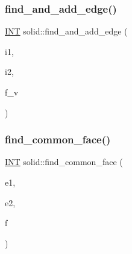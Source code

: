 \mbox{\label{classsolid_a91c02de4312c4942c0f6642154d97047}} 
\subsubsection{\texorpdfstring{find\+\_\+and\+\_\+add\+\_\+edge()}{find\_and\_add\_edge()}}
{\footnotesize\ttfamily \mbox{\hyperlink{galois_8h_a09fddde158a3a20bd2dcadb609de11dc}{I\+NT}} solid\+::find\+\_\+and\+\_\+add\+\_\+edge (\begin{DoxyParamCaption}\item[{\mbox{\hyperlink{galois_8h_a09fddde158a3a20bd2dcadb609de11dc}{I\+NT}}}]{i1,  }\item[{\mbox{\hyperlink{galois_8h_a09fddde158a3a20bd2dcadb609de11dc}{I\+NT}}}]{i2,  }\item[{\mbox{\hyperlink{galois_8h_a09fddde158a3a20bd2dcadb609de11dc}{I\+NT}}}]{f\+\_\+v }\end{DoxyParamCaption})}

\mbox{\label{classsolid_a187d6dfd122f2745345813a763e97fd7}} 
\subsubsection{\texorpdfstring{find\+\_\+common\+\_\+face()}{find\_common\_face()}}
{\footnotesize\ttfamily \mbox{\hyperlink{galois_8h_a09fddde158a3a20bd2dcadb609de11dc}{I\+NT}} solid\+::find\+\_\+common\+\_\+face (\begin{DoxyParamCaption}\item[{\mbox{\hyperlink{galois_8h_a09fddde158a3a20bd2dcadb609de11dc}{I\+NT}}}]{e1,  }\item[{\mbox{\hyperlink{galois_8h_a09fddde158a3a20bd2dcadb609de11dc}{I\+NT}}}]{e2,  }\item[{\mbox{\hyperlink{galois_8h_a09fddde158a3a20bd2dcadb609de11dc}{I\+NT}} \&}]{f }\end{DoxyParamCaption})}

\mbox{\label{classsolid_a4e6e784df5bac1fcd8398f5e6c7df493}} 
